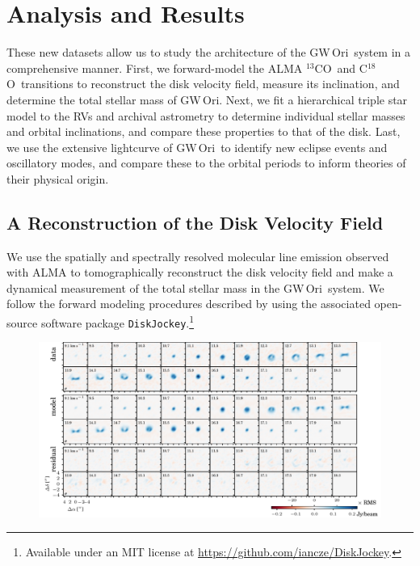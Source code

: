 \documentclass[twocolumn]{aastex61}
\newcommand{\obj}{GW\,Ori}
\newcommand{\thirteen}{${}^{13}$CO}
\newcommand{\eighteen}{C${}^{18}$O}
\begin{document}
\section{Analysis and Results \label{sec:analysis}}

These new datasets allow us to study the architecture of the \obj\ system in a comprehensive manner. First, we forward-model the ALMA \thirteen\ and \eighteen\ transitions to reconstruct the disk velocity field, measure its inclination, and determine the total stellar mass of \obj. Next, we fit a hierarchical triple star model to the RVs and archival astrometry to determine individual stellar masses and orbital inclinations, and compare these properties to that of the disk. Last, we use the extensive lightcurve of \obj\ to identify new eclipse events and oscillatory modes, and compare these to the orbital periods to inform theories of their physical origin.

\subsection{A Reconstruction of the Disk Velocity Field \label{sec:disk}}

We use the spatially and spectrally resolved molecular line emission observed with ALMA to tomographically reconstruct the disk velocity field and make a dynamical measurement of the total stellar mass in the \obj\ system. We follow the forward modeling procedures described by \citet{czekala15a,czekala16} using the associated open-source software package {\tt DiskJockey}.\footnote{Available under an MIT license at \url{https://github.com/iancze/DiskJockey}.}

\begin{figure}[ht!]
\begin{center}
  \includegraphics{chmaps_13CO.pdf}
  \end{center}
\end{figure}
\end{document}
